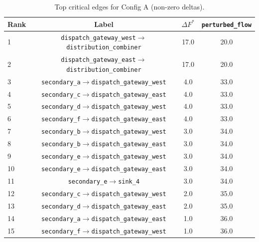 \documentclass[12pt]{report}
\begin{document}
\begin{table}[htbp]
\centering
\caption{Top critical edges for Config A (non-zero deltas).}
\label{tab:critical_edges_config_a}
\begin{tabular}{lccc}
\toprule
Rank & Label & $\Delta F^*$ & \texttt{perturbed\_flow} \\
\midrule
1  & \texttt{dispatch\_gateway\_west}$\to$\texttt{distribution\_combiner}  & 17.0 & 20.0 \\
2  & \texttt{dispatch\_gateway\_east}$\to$\texttt{distribution\_combiner}  & 17.0 & 20.0 \\
3  & \texttt{secondary\_a}$\to$\texttt{dispatch\_gateway\_west}            & 4.0  & 33.0 \\
4  & \texttt{secondary\_c}$\to$\texttt{dispatch\_gateway\_east}            & 4.0  & 33.0 \\
5  & \texttt{secondary\_d}$\to$\texttt{dispatch\_gateway\_west}            & 4.0  & 33.0 \\
6  & \texttt{secondary\_f}$\to$\texttt{dispatch\_gateway\_east}            & 4.0  & 33.0 \\
7  & \texttt{secondary\_b}$\to$\texttt{dispatch\_gateway\_west}            & 3.0  & 34.0 \\
8  & \texttt{secondary\_b}$\to$\texttt{dispatch\_gateway\_east}            & 3.0  & 34.0 \\
9  & \texttt{secondary\_e}$\to$\texttt{dispatch\_gateway\_west}            & 3.0  & 34.0 \\
10 & \texttt{secondary\_e}$\to$\texttt{dispatch\_gateway\_east}            & 3.0  & 34.0 \\
11 & \texttt{secondary\_e}$\to$\texttt{sink\_4}                            & 3.0  & 34.0 \\
12 & \texttt{secondary\_c}$\to$\texttt{dispatch\_gateway\_west}            & 2.0  & 35.0 \\
13 & \texttt{secondary\_d}$\to$\texttt{dispatch\_gateway\_east}            & 2.0  & 35.0 \\
14 & \texttt{secondary\_a}$\to$\texttt{dispatch\_gateway\_east}            & 1.0  & 36.0 \\
15 & \texttt{secondary\_f}$\to$\texttt{dispatch\_gateway\_west}            & 1.0  & 36.0 \\
\bottomrule
\end{tabular}
\end{table}
\end{document}
